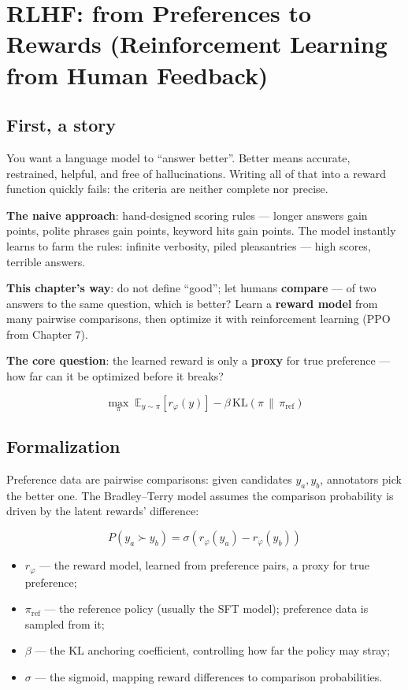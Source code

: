 \documentclass{article}
\begin{document}
\section*{RLHF: from Preferences to Rewards (Reinforcement Learning from Human Feedback)}

\subsection*{First, a story}

You want a language model to ``answer better''. Better means accurate, restrained, helpful, and free of hallucinations. Writing all of that into a reward function quickly fails: the criteria are neither complete nor precise.

\textbf{The naive approach}: hand-designed scoring rules --- longer answers gain points, polite phrases gain points, keyword hits gain points. The model instantly learns to farm the rules: infinite verbosity, piled pleasantries --- high scores, terrible answers.

\textbf{This chapter's way}: do not define ``good''; let humans \textbf{compare} --- of two answers to the same question, which is better? Learn a \textbf{reward model} from many pairwise comparisons, then optimize it with reinforcement learning (PPO from Chapter 7).

\textbf{The core question}: the learned reward is only a \textbf{proxy} for true preference --- how far can it be optimized before it breaks?

\[
\boxed{\max_{\pi}\; \mathbb{E}_{y\sim\pi}\left[r_{\varphi}(y)\right] - \beta\,\mathrm{KL}\!\left(\pi \,\|\, \pi_{\mathrm{ref}}\right)}
\]

\subsection*{Formalization}

Preference data are pairwise comparisons: given candidates $y_a, y_b$, annotators pick the better one. The Bradley--Terry model assumes the comparison probability is driven by the latent rewards' difference:

\[
\boxed{P(y_a \succ y_b) = \sigma\!\left(r_{\varphi}(y_a) - r_{\varphi}(y_b)\right)}
\]

\begin{itemize}
  \item $r_{\varphi}$ --- the reward model, learned from preference pairs, a proxy for true preference;
  \item $\pi_{\mathrm{ref}}$ --- the reference policy (usually the SFT model); preference data is sampled from it;
  \item $\beta$ --- the KL anchoring coefficient, controlling how far the policy may stray;
  \item $\sigma$ --- the sigmoid, mapping reward differences to comparison probabilities.
\end{itemize}
\end{document}
